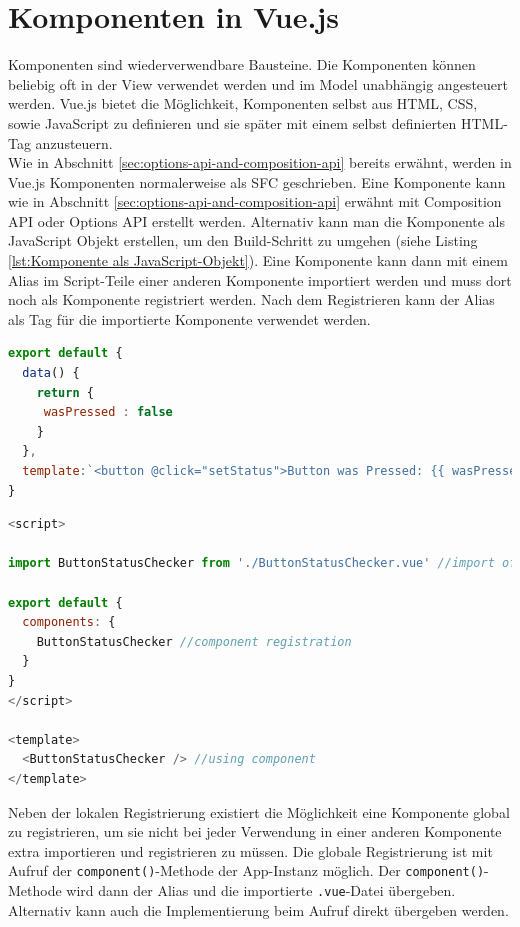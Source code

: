 \section{Komponenten in Vue.js}\label{sec:komponenten-in-vue.js}
Komponenten sind wiederverwendbare Bausteine.
Die Komponenten können beliebig oft in der View verwendet werden und im Model unabhängig angesteuert werden.
Vue.js bietet die Möglichkeit, Komponenten selbst aus HTML, CSS, sowie JavaScript zu definieren und sie später mit einem
selbst definierten HTML-Tag anzusteuern. \cite[S. 11-12]{steyer2019}
\\
Wie in Abschnitt \ref{sec:options-api-and-composition-api} bereits erwähnt, werden in Vue.js Komponenten normalerweise als SFC geschrieben.
Eine Komponente kann wie in Abschnitt \ref{sec:options-api-and-composition-api} erwähnt mit Composition API oder Options API
erstellt werden.
Alternativ kann man die Komponente als JavaScript Objekt erstellen, um den Build-Schritt zu umgehen (siehe Listing \ref{lst:Komponente als JavaScript-Objekt}).
Eine Komponente kann dann mit einem Alias im Script-Teile einer anderen Komponente importiert werden und muss dort noch als Komponente
registriert werden.
Nach dem Registrieren kann der Alias als Tag für die importierte Komponente verwendet werden. \cite{vueComponents}

\newpage

\begin{lstlisting}[caption={Komponente als JavaScript Objekt},language=javascript,label={lst:Komponente als JavaScript-Objekt}]
export default {
  data() {
    return {
     wasPressed : false
    }
  },
  template:`<button @click="setStatus">Button was Pressed: {{ wasPressed }}</button>`
}
\end{lstlisting}


\begin{lstlisting}[caption={Verwendung einer Komponente},language=javascript,label={lst:Verwendung einer Komponente}]
<script>

import ButtonStatusChecker from './ButtonStatusChecker.vue' //import of component

export default {
  components: {
    ButtonStatusChecker //component registration
  }
}
</script>

<template>
  <ButtonStatusChecker /> //using component
</template>
\end{lstlisting}

Neben der lokalen Registrierung existiert die Möglichkeit eine Komponente global
zu registrieren, um sie nicht bei jeder Verwendung in einer anderen Komponente
extra importieren und registrieren zu müssen.
Die globale Registrierung ist mit Aufruf der \texttt{component()}-Methode der App-Instanz möglich.
Der \texttt{component()}-Methode wird dann der Alias und die importierte \texttt{.vue}-Datei übergeben.
Alternativ kann auch die Implementierung beim Aufruf direkt übergeben werden. \cite{vueComponentsRegistration}

